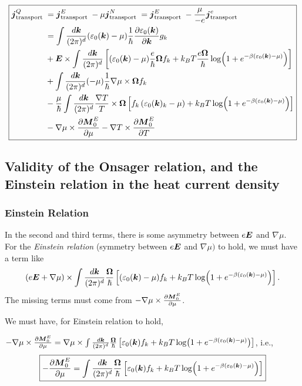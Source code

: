 \documentclass{report}
\renewcommand\vec[1]{\ensuremath\boldsymbol{#1}} %
\begin{document}
\begin{equation}\label{Eq:heat-current-density-transport}
	\boxed{\begin{aligned}
	\vec{j}_{\text {transport }}^{Q} &=\vec{j}_{\text {transport }}^{E}-\mu \vec{j}_{\text {transport }}^{N}  = \vec{j}_{\text {transport }}^{E}-\frac{\mu}{-e} \vec{j}_{\text {transport }}^{e}\\
	&=\int \frac{d\vec{k}}{(2\pi)^d}(\varepsilon_0(\vec{k})-\mu) \frac{1}{\hbar} \frac{\partial \varepsilon_0(\vec{k})}{\partial \vec{k}} g_{k} \\
	&+\vec{E} \times \int \frac{d\vec{k}}{(2\pi)^d} \left[(\varepsilon_0(\vec{k})-\mu) \frac{e}{\hbar} \vec{\Omega} f_{k} + k_{B} T \frac{e \vec{\Omega}}{\hbar} \log(1 + e^{-\beta(\varepsilon_0(\vec{k}) - \mu)})\right] \\
	&+ \int \frac{d\vec{k}}{(2\pi)^d} (-\mu) \frac{1}{\hbar} \nabla \mu \times \vec{\Omega} f_{k} \\
	&-\frac{\mu}{\hbar} \int \frac{d\vec{k}}{(2\pi)^d} \frac{\nabla T}{T} \times \vec{\Omega}\left[f_{k}\left(\varepsilon_0(\vec{k})_{k}-\mu\right)+k_{B} T \log(1 + e^{-\beta(\varepsilon_0(\vec{k}) - \mu)})\right] \\
	&-\nabla \mu \times \frac{\partial \vec{M}_{0}^{E}}{\partial \mu}-\nabla T \times \frac{\partial \vec{M}_{0}^{E}}{\partial T}
\end{aligned}}
\end{equation}
\subsection{Validity of the Onsager relation, and the Einstein relation in the heat current density}
\subsubsection{Einstein Relation}
In the second and third terms, there is some asymmetry between $e \vec{E}$ and $\nabla \mu$. For the \textit{Einstein relation} (symmetry between $e \vec{E}$ and $\nabla \mu)$ to hold, we must have a term like $$(e\vec{E} + \nabla \mu) \times \int \frac{d\vec{k}}{(2\pi)^d}  \frac{ \vec{\Omega}}{\hbar} \left[(\varepsilon_0(\vec{k})-\mu) f_{k} + k_{B} T \log(1 + e^{-\beta(\varepsilon_0(\vec{k}) - \mu)})\right].$$
The missing terms must come from $-\nabla \mu \times \frac{\partial \vec{M}_{0}^{E}}{\partial \mu}$. 

We must have, for Einstein relation to hold, 

$-\nabla \mu \times \frac{\partial \vec{M}_{0}^{E}}{\partial \mu} =  \nabla \mu \times \int \frac{d\vec{k}}{(2\pi)^d}  \frac{ \vec{\Omega}}{\hbar} \left[\varepsilon_0(\vec{k}) f_{k} + k_{B} T \log(1 + e^{-\beta(\varepsilon_0(\vec{k}) - \mu)})\right]$,
i.e., 
\begin{equation}\label{Eq:energy-mag-condition}
	\boxed{-\frac{\partial \vec{M}_{0}^{E}}{\partial \mu}=\int \frac{d\vec{k}}{(2\pi)^d}  \frac{ \vec{\Omega}}{\hbar} \left[\varepsilon_0(\vec{k}) f_{k} + k_{B} T \log(1 + e^{-\beta(\varepsilon_0(\vec{k}) - \mu)})\right]}
\end{equation}
\end{document}
